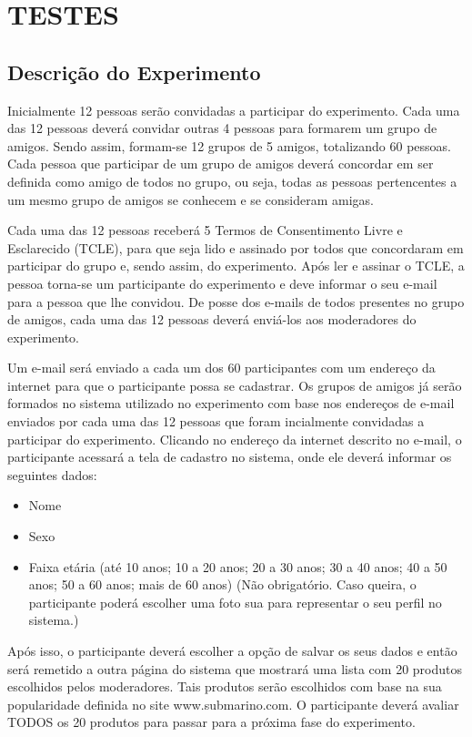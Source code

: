 \chapter{TESTES} %
\label{cha:testes} %

\section{Descrição do Experimento}
\label{cha:descricao_do_experimento}

 Inicialmente 12 pessoas serão convidadas a participar do experimento. Cada uma das 12 pessoas deverá convidar outras 4 pessoas para formarem um grupo de amigos. Sendo assim, formam-se 12 grupos de 5 amigos, totalizando 60 pessoas. Cada pessoa que participar de um grupo de amigos deverá concordar em ser definida como amigo de todos no grupo, ou seja, todas as pessoas pertencentes a um mesmo grupo de amigos se conhecem e se consideram amigas.

 Cada uma das 12 pessoas receberá 5 Termos de Consentimento Livre e Esclarecido (TCLE), para que seja lido e assinado por todos que concordaram em participar do grupo e, sendo assim, do experimento. Após ler e assinar o TCLE, a pessoa torna-se um participante do experimento e deve informar o seu e-mail para a pessoa que lhe convidou. De posse dos e-mails de todos presentes no grupo de amigos, cada uma das 12 pessoas deverá enviá-los aos moderadores do experimento.

 Um e-mail será enviado a cada um dos 60 participantes com um endereço da internet para que o participante possa se cadastrar. Os grupos de amigos já serão formados no sistema utilizado no experimento com base nos endereços de e-mail enviados por cada uma das 12 pessoas que foram incialmente convidadas a participar do experimento. Clicando no endereço da internet descrito no e-mail, o participante acessará a tela de cadastro no sistema, onde ele deverá informar os seguintes dados:

\begin{itemize}
	\item Nome
	\item Sexo
	\item Faixa etária (até 10 anos; 10 a 20 anos; 20 a 30 anos; 30 a 40 anos; 40 a 50 anos; 50 a 60 anos; mais de 60 anos)
	\itemFoto (Não obrigatório. Caso queira, o participante poderá escolher uma foto sua para representar o seu perfil no sistema.)
\end{itemize}

 Após isso, o participante deverá escolher a opção de salvar os seus dados e então será remetido a outra página do sistema que mostrará uma lista com 20 produtos escolhidos pelos moderadores. Tais produtos serão escolhidos com base na sua popularidade definida no site www.submarino.com. O participante deverá avaliar TODOS os 20 produtos para passar para a próxima fase do experimento.

